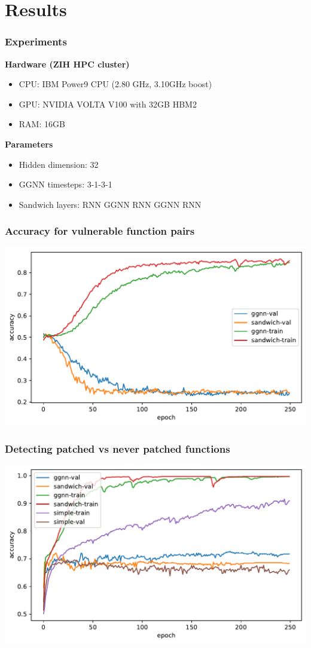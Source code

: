 \documentclass[aspectratio=169,xcolor=table]{beamer}
\begin{document}
\section{Results}

\begin{frame}[label=current]\frametitle{Experiments}
  \textbf{Hardware (ZIH HPC cluster)}
  \begin{itemize}
    \item CPU: IBM Power9 CPU (2.80 GHz, 3.10GHz boost)
    \item GPU: NVIDIA VOLTA V100 with 32GB HBM2
    \item RAM: 16GB
  \end{itemize}

  \vspace{1em}

  \textbf{Parameters}
  \begin{itemize}
    \item Hidden dimension: 32
    \item GGNN timesteps: 3-1-3-1
    \item Sandwich layers: RNN GGNN RNN GGNN RNN
  \end{itemize}
\end{frame}


\begin{frame}\frametitle{Accuracy for vulnerable function pairs}
  \includegraphics[width=\framewidth]{media/plot-acc-paired}
\end{frame}

\begin{frame}\frametitle{Detecting patched vs never patched functions}
  \includegraphics[width=\framewidth]{media/plot-acc-exclusive}
\end{frame}
\end{document}
